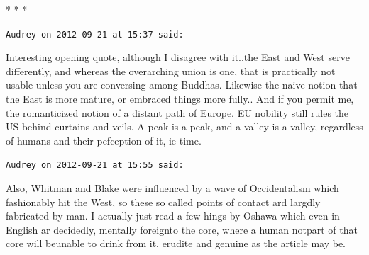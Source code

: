 
\begin{center}* * *\end{center}

\begin{footnotesize}
\begin{sffamily}
\texttt{Audrey on 2012-09-21 at 15:37 said:}

Interesting opening quote, although I disagree with it..the East and West serve differently, and whereas the overarching union is one, that is practically not usable unless you are conversing among Buddhas. Likewise the naive notion that the East is more mature, or embraced things more fully.. And if you permit me, the romanticized notion of a distant path of Europe. EU nobility still rules the US behind curtains and veils. A peak is a peak, and a valley is a valley, regardless of humans and their pefception of it, ie time.

\hfill

\texttt{Audrey on 2012-09-21 at 15:55 said:}

Also, Whitman and Blake were influenced by a wave of Occidentalism which fashionably hit the West, so these so called points of contact ard largdly fabricated by man. I actually just read a few hings by Oshawa which even in English ar decidedly, mentally foreignto the core, where a human notpart of that core will beunable to drink from it, erudite and genuine as the article may be.

\hfill

\end{sffamily}
\end{footnotesize}

